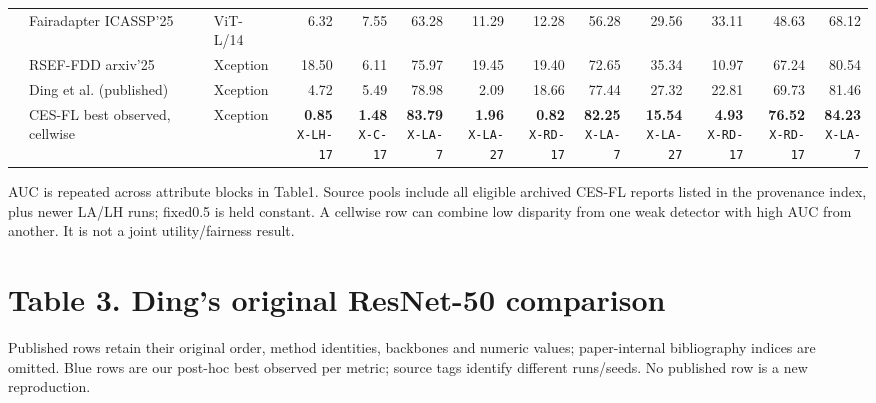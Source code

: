 \documentclass[10pt]{article}
\newcommand{\note}[1]{{\fontsize{8}{10}\selectfont #1\par}}
\begin{document}
{\begin{tabular*}{\linewidth}{@{\extracolsep{\fill}}lllrrrrrrrrrr}
 & Fairadapter ICASSP'25 & ViT-L/14 & 6.32 & 7.55 & 63.28 & 11.29 & 12.28 & 56.28 & 29.56 & 33.11 & 48.63 & 68.12\\
 & RSEF-FDD arxiv'25 & Xception & 18.50 & 6.11 & 75.97 & 19.45 & 19.40 & 72.65 & 35.34 & 10.97 & 67.24 & 80.54\\
 & Ding et al. (published) & Xception & 4.72 & 5.49 & 78.98 & 2.09 & 18.66 & 77.44 & 27.32 & 22.81 & 69.73 & 81.46\\
\rowcolor{blue!8} & CES-FL best observed, cellwise & Xception & \shortstack{\textbf{0.85}\\{\tiny\texttt{X-LH-17}}} & \shortstack{\textbf{1.48}\\{\tiny\texttt{X-C-17}}} & \shortstack{\textbf{83.79}\\{\tiny\texttt{X-LA-7}}} & \shortstack{\textbf{1.96}\\{\tiny\texttt{X-LA-27}}} & \shortstack{\textbf{0.82}\\{\tiny\texttt{X-RD-17}}} & \shortstack{\textbf{82.25}\\{\tiny\texttt{X-LA-7}}} & \shortstack{\textbf{15.54}\\{\tiny\texttt{X-LA-27}}} & \shortstack{\textbf{4.93}\\{\tiny\texttt{X-RD-17}}} & \shortstack{\textbf{76.52}\\{\tiny\texttt{X-RD-17}}} & \shortstack{\textbf{84.23}\\{\tiny\texttt{X-LA-7}}}\\
\bottomrule\end{tabular*}}\par
\note{AUC is repeated across attribute blocks in Table1. Source pools include all eligible archived CES-FL reports listed in the provenance index, plus newer LA/LH runs; fixed0.5 is held constant. A cellwise row can combine low disparity from one weak detector with high AUC from another. It is not a joint utility/fairness result.}
\clearpage\section*{Table 3. Ding's original ResNet-50 comparison}
\note{Published rows retain their original order, method identities, backbones and numeric values; paper-internal bibliography indices are omitted. Blue rows are our post-hoc best observed per metric; source tags identify different runs/seeds. No published row is a new reproduction.}
\end{document}
